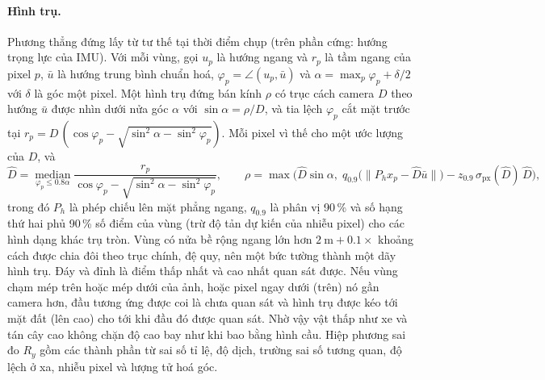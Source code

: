 \documentclass[11pt,a4paper]{article}
\theoremstyle{plain}
\theoremstyle{definition}
\theoremstyle{remark}
\begin{document}
\paragraph{Hình trụ.} Phương thẳng đứng lấy từ tư thế tại thời điểm chụp (trên phần cứng: hướng trọng lực của IMU). Với mỗi vùng, gọi $u_p$ là hướng ngang và $r_p$ là tầm ngang của pixel $p$, $\bar u$ là hướng trung bình chuẩn hoá, $\varphi_p = \angle(u_p,\bar u)$ và $\alpha = \max_p\varphi_p + \delta/2$ với $\delta$ là góc một pixel. Một hình trụ đứng bán kính $\rho$ có trục cách camera $D$ theo hướng $\bar u$ được nhìn dưới nửa góc $\alpha$ với $\sin\alpha = \rho/D$, và tia lệch $\varphi_p$ cắt mặt trước tại $r_p = D\,(\cos\varphi_p - \sqrt{\sin^2\alpha - \sin^2\varphi_p})$. Mỗi pixel vì thế cho một ước lượng của $D$, và
\begin{equation}\label{eq:cyl}
\hat D = \operatorname*{median}_{\varphi_p \le 0.8\alpha} \frac{r_p}{\cos\varphi_p - \sqrt{\sin^2\alpha - \sin^2\varphi_p}}, \qquad
\rho = \max\!\Big(\hat D\sin\alpha,\; q_{0.9}\big(\|P_h x_p - \hat D\bar u\|\big) - z_{0.9}\,\sigma_{\mathrm{px}}(\hat D)\,\hat D\Big),
\end{equation}
trong đó $P_h$ là phép chiếu lên mặt phẳng ngang, $q_{0.9}$ là phân vị 90\,\% và số hạng thứ hai phủ 90\,\% số điểm của vùng (trừ độ tản dự kiến của nhiễu pixel) cho các hình dạng khác trụ tròn. Vùng có nửa bề rộng ngang lớn hơn $2~\text{m} + 0.1\times$ khoảng cách được chia đôi theo trục chính, đệ quy, nên một bức tường thành một dãy hình trụ. Đáy và đỉnh là điểm thấp nhất và cao nhất quan sát được. Nếu vùng chạm mép trên hoặc mép dưới của ảnh, hoặc pixel ngay dưới (trên) nó gần camera hơn, đầu tương ứng được coi là chưa quan sát và hình trụ được kéo tới mặt đất (lên cao) cho tới khi đầu đó được quan sát. Nhờ vậy vật thấp như xe và tán cây cao không chặn độ cao bay như khi bao bằng hình cầu. Hiệp phương sai đo $R_y$ gồm các thành phần từ sai số tỉ lệ, độ dịch, trường sai số tương quan, độ lệch ở xa, nhiễu pixel và lượng tử hoá góc.
\end{document}
